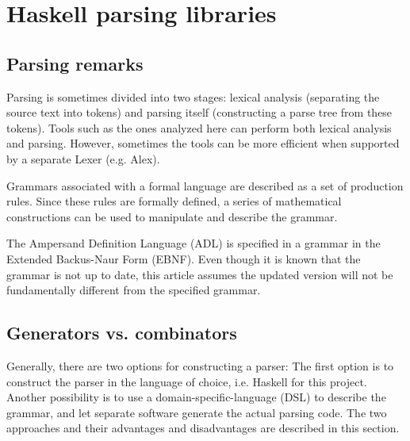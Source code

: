 
\section{Haskell parsing libraries}
\label{sec:libraries}

\subsection{Parsing remarks}
%
%
%
Parsing is sometimes divided into two stages: lexical analysis (separating the source text into tokens) and parsing itself (constructing a parse tree from these tokens).
Tools such as the ones analyzed here can perform both lexical analysis and parsing.
However, sometimes the tools can be more efficient when supported by a separate Lexer (e.g. Alex).

Grammars associated with a formal language are described as a set of production rules.
Since these rules are formally defined, a series of mathematical constructions can be used to manipulate and describe the grammar.

%
%
%
The Ampersand Definition Language (ADL) is specified in a grammar in the Extended Backus-Naur Form (EBNF).
Even though it is known that the grammar is not up to date, this article assumes the updated version will not be fundamentally different from the specified grammar.

\subsection{Generators vs. combinators}
%
Generally, there are two options for constructing a parser:
The first option is to construct the parser in the language of choice, i.e. Haskell for this project.
Another possibility is to use a domain-specific-language (DSL) to describe the grammar, and let separate software generate the actual parsing code.
The two approaches and their advantages and disadvantages are described in this section.


